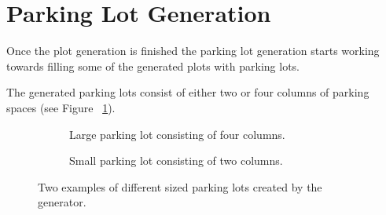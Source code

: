 \section{Parking Lot Generation}

Once the plot generation is finished the parking lot generation starts working towards filling some of the generated plots with parking lots.

The generated parking lots consist of either two or four columns of parking spaces (see Figure ~\ref{fig:sizebased}).
\begin{figure}[H]
   \centering
   \begin{subfigure}[b]{0.485\textwidth}
     \caption{Large parking lot consisting of four columns.}
   \end{subfigure}
   \quad
   \begin{subfigure}[b]{0.45\textwidth}
     \caption{Small parking lot consisting of two columns.}
   \end{subfigure}
     \caption{Two examples of different sized parking lots created by the generator.}
   \label{fig:sizebased}
 \end{figure}
